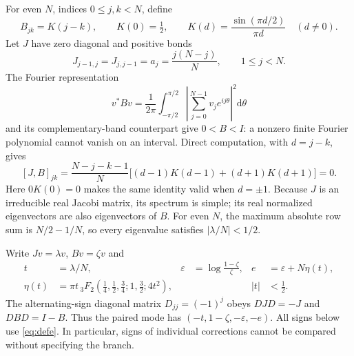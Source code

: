 \documentclass[10pt]{article}
\newcommand{\dd}{\mathrm d}
\begin{document}
For even $N$, indices $0\le j,k<N$, define
\begin{equation}
 B_{jk}=K(j-k),\qquad K(0)=\tfrac12,\qquad
 K(d)=\frac{\sin(\pi d/2)}{\pi d}\quad(d\ne0).
 \label{eq:kernel}
\end{equation}
Let $J$ have zero diagonal and positive bonds
\begin{equation}
 J_{j-1,j}=J_{j,j-1}=a_j=\frac{j(N-j)}{N},\qquad 1\le j<N.
 \label{eq:jacobi}
\end{equation}
The Fourier representation
\begin{equation}
 v^*Bv=\frac1{2\pi}\int_{-\pi/2}^{\pi/2}
       \left|\sum_{j=0}^{N-1}v_j e^{ij\theta}\right|^2\dd\theta
 \label{eq:fourier}
\end{equation}
and its complementary-band counterpart give $0<B<I$: a nonzero finite Fourier polynomial cannot vanish on an interval. Direct computation, with $d=j-k$, gives
\[
 [J,B]_{jk}=\frac{N-j-k-1}{N}
       \bigl[(d-1)K(d-1)+(d+1)K(d+1)\bigr]=0.
\]
Here $0K(0)=0$ makes the same identity valid when $d=\pm1$. Because $J$ is an irreducible real Jacobi matrix, its spectrum is simple; its real normalized eigenvectors are also eigenvectors of $B$.
For even $N$, the maximum absolute row sum is $N/2-1/N$, so every eigenvalue satisfies $|\lambda/N|<1/2$.

Write $Jv=\lambda v$, $Bv=\zeta v$ and
\begin{align}
 t&=\lambda/N, &\varepsilon&=\log\frac{1-\zeta}{\zeta}, & e&=\varepsilon+N\eta(t), \label{eq:defe}\\
 \eta(t)&=\pi t\,{}_3F_2\!\left(\tfrac14,\tfrac12,\tfrac34;1,\tfrac32;4t^2\right),
 &&& |t|&<\tfrac12. \label{eq:eta}
\end{align}
The alternating-sign diagonal matrix $D_{jj}=(-1)^j$ obeys $DJD=-J$ and $DBD=I-B$. Thus the paired mode has $(-t,1-\zeta,-\varepsilon,-e)$. All signs below use \eqref{eq:defe}. In particular, signs of individual corrections cannot be compared without specifying the branch.
\end{document}
